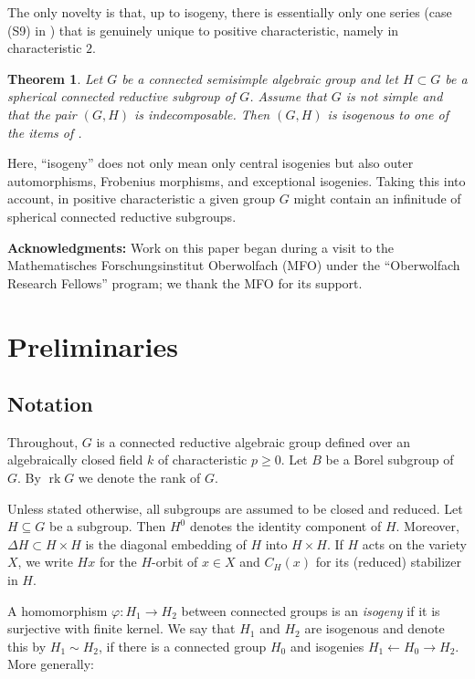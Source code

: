 \documentclass[12pt]{amsart}
\renewcommand{\phi}{\varphi}
\newcommand\rk{\operatorname{rk}}
\numberwithin{equation}{section}
\newtheorem{theorem}[theorem]{Theorem}
\theoremstyle{definition}
\begin{document}
The only novelty is that, up to
isogeny, there is essentially only one series (case (S9) in
) that is genuinely unique to positive
characteristic, namely in characteristic $2$.


\begin{theorem}
  \label{thm:main}
  Let $G$ be a connected semisimple algebraic group and let
  $H \subset G$ be a spherical connected reductive subgroup of
  $G$. Assume that $G$ is not simple and that the pair $(G,H)$ is
  indecomposable. Then $(G,H)$ is isogenous to one of the items of
  .
\end{theorem}


Here, ``isogeny'' does not only mean only central isogenies but also outer automorphisms, Frobenius morphisms, and exceptional
isogenies. Taking this into account, in positive characteristic a
given group $G$ might contain an infinitude of spherical connected
reductive subgroups.


\textbf{Acknowledgments:} Work on this paper began during a visit to the Mathematisches Forschungsinstitut Oberwolfach (MFO) under the ``Oberwolfach Research Fellows'' program; we thank the MFO for its support.


\section{Preliminaries}
\label{sec:basics}

\subsection{Notation}
Throughout, $G$ is a connected reductive algebraic group defined over
an algebraically closed field $k$ of characteristic $p\geqslant  0$. Let $B$ be a
Borel subgroup of $G$. By $\rk G$ we denote the rank of $G$.

Unless stated otherwise, all subgroups are assumed to be closed
and reduced.  Let $H\subseteq G$ be a subgroup. Then $H^0$ denotes the identity component of $H$. Moreover, $\Delta H \subset H \times H$ is the diagonal embedding of $H$ into $H \times H$. If $H$ acts
on the variety $X$, we write  $Hx$ for the $H$-orbit of $x\in X$  and $C_H(x)$ for its (reduced) stabilizer in $H$.

A homomorphism $\phi:H_1\to H_2$ between connected groups is an
\emph{isogeny} if it is surjective with finite kernel. We say that
$H_1$ and $H_2$ are isogenous and denote this by $H_1 \sim H_2$, if
there is a connected group $H_0$ and isogenies
$H_1\leftarrow H_0\to H_2$. More generally:
\end{document}
